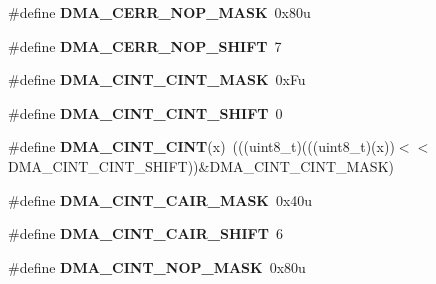 \begin{DoxyCompactItemize}
\item 
\#define {\bfseries D\+M\+A\+\_\+\+C\+E\+R\+R\+\_\+\+N\+O\+P\+\_\+\+M\+A\+SK}~0x80u\hypertarget{group__DMA__Register__Masks_gac284972d1fac094dd241e268d7a0ee17}{}\label{group__DMA__Register__Masks_gac284972d1fac094dd241e268d7a0ee17}

\item 
\#define {\bfseries D\+M\+A\+\_\+\+C\+E\+R\+R\+\_\+\+N\+O\+P\+\_\+\+S\+H\+I\+FT}~7\hypertarget{group__DMA__Register__Masks_ga06ff2ec2da47380a89fcd01777bbe400}{}\label{group__DMA__Register__Masks_ga06ff2ec2da47380a89fcd01777bbe400}

\item 
\#define {\bfseries D\+M\+A\+\_\+\+C\+I\+N\+T\+\_\+\+C\+I\+N\+T\+\_\+\+M\+A\+SK}~0x\+Fu\hypertarget{group__DMA__Register__Masks_ga1edbbba2f0260e0467e0a43e04eaaa1d}{}\label{group__DMA__Register__Masks_ga1edbbba2f0260e0467e0a43e04eaaa1d}

\item 
\#define {\bfseries D\+M\+A\+\_\+\+C\+I\+N\+T\+\_\+\+C\+I\+N\+T\+\_\+\+S\+H\+I\+FT}~0\hypertarget{group__DMA__Register__Masks_ga5fd76123ada3ca8b762c83b344994a78}{}\label{group__DMA__Register__Masks_ga5fd76123ada3ca8b762c83b344994a78}

\item 
\#define {\bfseries D\+M\+A\+\_\+\+C\+I\+N\+T\+\_\+\+C\+I\+NT}(x)~(((uint8\+\_\+t)(((uint8\+\_\+t)(x))$<$$<$D\+M\+A\+\_\+\+C\+I\+N\+T\+\_\+\+C\+I\+N\+T\+\_\+\+S\+H\+I\+FT))\&D\+M\+A\+\_\+\+C\+I\+N\+T\+\_\+\+C\+I\+N\+T\+\_\+\+M\+A\+SK)\hypertarget{group__DMA__Register__Masks_ga2aba228e6eca0c2db8b375c15b38cdcb}{}\label{group__DMA__Register__Masks_ga2aba228e6eca0c2db8b375c15b38cdcb}

\item 
\#define {\bfseries D\+M\+A\+\_\+\+C\+I\+N\+T\+\_\+\+C\+A\+I\+R\+\_\+\+M\+A\+SK}~0x40u\hypertarget{group__DMA__Register__Masks_gad5b3c0206e0a7af209d0e9e5e68d2526}{}\label{group__DMA__Register__Masks_gad5b3c0206e0a7af209d0e9e5e68d2526}

\item 
\#define {\bfseries D\+M\+A\+\_\+\+C\+I\+N\+T\+\_\+\+C\+A\+I\+R\+\_\+\+S\+H\+I\+FT}~6\hypertarget{group__DMA__Register__Masks_gaf7dd4a94c052317c29e7bd1bcb82532d}{}\label{group__DMA__Register__Masks_gaf7dd4a94c052317c29e7bd1bcb82532d}

\item 
\#define {\bfseries D\+M\+A\+\_\+\+C\+I\+N\+T\+\_\+\+N\+O\+P\+\_\+\+M\+A\+SK}~0x80u\hypertarget{group__DMA__Register__Masks_ga46266d0d4343c952af65db101c5c9a61}{}\label{group__DMA__Register__Masks_ga46266d0d4343c952af65db101c5c9a61}


\end{DoxyCompactItemize}
